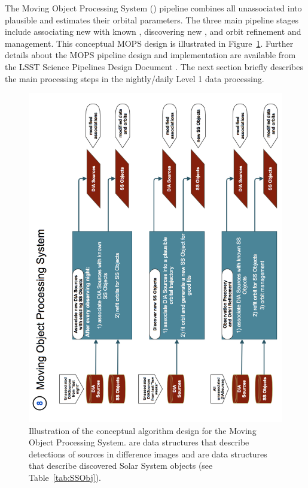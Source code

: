 The Moving Object Processing System () pipeline combines all unassociated \DIASources into
plausible \SSObjects and estimates their orbital parameters. The three main pipeline stages
include associating new \DIASources with known \SSObjects, discovering new \SSObjects,
and orbit refinement and management. This conceptual MOPS design is illustrated in
Figure~\ref{fig:Pipe8}. Further details about the MOPS pipeline design and implementation are available
from the LSST Science Pipelines Design Document \citep{LDM-151}.
The next section briefly describes the main processing steps in the nightly/daily Level 1 data processing.

\begin{figure}[!t]
    \centering
    \includegraphics[scale=0.60, angle=270]{MOPS-Level0}
    \vskip -0.1in
    \caption{Illustration of the conceptual algorithm design for the Moving Object Processing System.
   \DIASources are data structures that describe detections of sources in difference images and
   \SSObjects are data structures that describe discovered Solar System objects (see Table~\ref{tab:SSObj}).
\label{fig:Pipe8}}
\end{figure}


